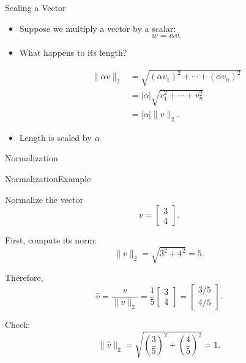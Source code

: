 \documentclass[10pt]{beamer}
\begin{document}
\begin{frame}{Scaling a Vector}

\begin{itemize}
    \item  Suppose we multiply a vector by a scalar:
\[
w=\alpha v.
\]

\item  What happens to its length?

\begin{align*}
\|\alpha v\|_2
&=
\sqrt{(\alpha v_1)^2+\cdots+(\alpha v_n)^2}\\
&=
|\alpha|
\sqrt{v_1^2+\cdots+v_n^2}\\
&=
\boxed{|\alpha|\|v\|_2}.
\end{align*}

\vfill

\item Length is scaled by $\alpha $
\end{itemize}


\end{frame}

\begin{frame}{Normalization}




\end{frame}

\begin{frame}{Normalization}{Example}

\begin{example}
Normalize the vector
\[
v=
\begin{bmatrix}
3\\4
\end{bmatrix}.
\]
\end{example}

First, compute its norm:
\[
\|v\|_2
=
\sqrt{3^2+4^2}
=
5.
\]

Therefore,
\[
\widehat{v}
=
\frac{v}{\|v\|_2}
=
\frac{1}{5}
\begin{bmatrix}
3\\4
\end{bmatrix}
=
\begin{bmatrix}
3/5\\4/5
\end{bmatrix}.
\]

Check:
\[
\|\widehat{v}\|_2
=
\sqrt{\left(\frac35\right)^2+\left(\frac45\right)^2}
=
1.
\]

\end{frame}
\end{document}
